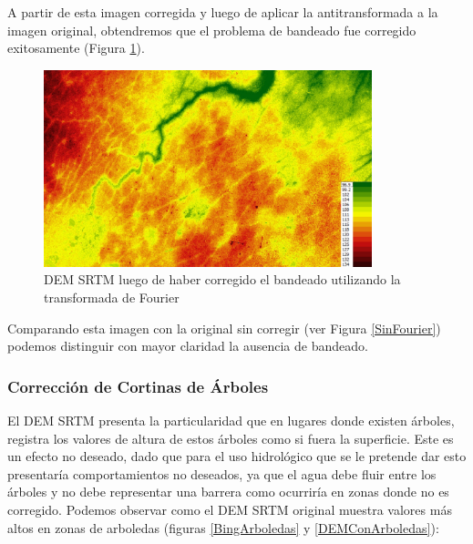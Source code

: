 \documentclass[10pt,a4paper, twoside]{report}
\newcounter{subsubsubsection}[subsubsection]
\begin{document}



A partir de esta imagen corregida y luego de aplicar la antitransformada a la imagen original, obtendremos que el problema de bandeado fue corregido exitosamente (Figura \ref{SRTMSinFourierCorrected}).

\begin{figure}[H]
   \centering      
   \includegraphics[width=0.85\textwidth]{imagenes/SRTMSinFourierCorrected.jpg}
 \caption{DEM SRTM luego de haber corregido el bandeado utilizando la transformada de Fourier}
 \label{SRTMSinFourierCorrected}
\end{figure}

Comparando esta imagen con la original sin corregir (ver Figura \ref{SinFourier}) podemos distinguir con mayor claridad la ausencia de bandeado.


\subsubsection{Corrección de Cortinas de Árboles}
\label{correccionACortinasDeArboles}

El DEM SRTM presenta la particularidad que en lugares donde existen árboles, registra los valores de altura de estos árboles como si fuera la superficie. Este es un efecto no deseado, dado que para el uso hidrológico que se le pretende dar esto presentaría comportamientos no deseados, ya que el agua debe fluir entre los árboles y no debe representar una barrera como ocurriría en zonas donde no es corregido. Podemos observar como el DEM SRTM original muestra valores más altos en zonas de arboledas (figuras \ref{BingArboledas} y \ref{DEMConArboledas}):
\end{document}
